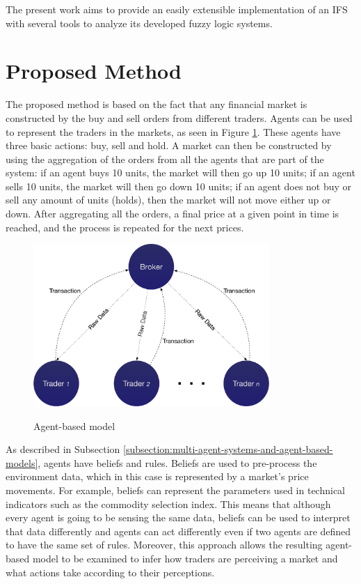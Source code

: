 \documentclass[review]{elsarticle}
\begin{document}
The present work aims to provide an easily extensible implementation of an IFS with several tools to analyze 
its developed fuzzy logic systems.

\section{Proposed Method}
\label{section:proposed-method}

The proposed method is based on the fact that any financial market is constructed by the buy and sell orders from different traders. Agents can be used to represent the traders in the markets, as seen in Figure \ref{figure:agent-based-model}. These agents have three basic actions: buy, sell and hold. A market can then be constructed by using the aggregation of the orders from all the agents that are part of the system: if an agent buys 10 units, the market will then go up 10 units; if an agent sells 10 units, the market will then go down 10 units; if an agent does not buy or sell any amount of units (holds), then the market will not move either up or down. After aggregating all the orders, a final price at a given point in time is reached, and the process is repeated for the next prices.

\begin{figure}
\caption{Agent-based model}
\centering
\includegraphics[width=0.8\textwidth]{img/agent-model.pdf}
\label{figure:agent-based-model}
\end{figure}

As described in Subsection \ref{subsection:multi-agent-systems-and-agent-based-models}, agents have beliefs and rules. Beliefs are used to pre-process the environment data, which in this case is represented by a market's price movements. For example, beliefs can represent the parameters used in technical indicators such as the commodity selection index. This means that although every agent is going to be sensing the same data, beliefs can be used to interpret that data differently and agents can act differently even if two agents are defined to have the same set of rules. Moreover, this approach allows the resulting agent-based model to be examined to infer how traders are perceiving a market and what actions take according to their perceptions.
\end{document}
